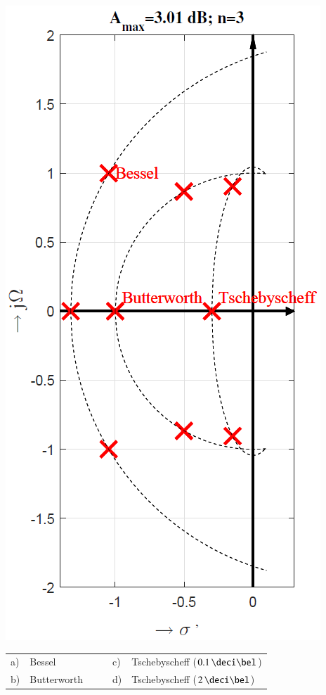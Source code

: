 \begin{minipage}[c]{0.28\columnwidth}
    \includegraphics[width=\columnwidth]{images/filter_vergleich_pollagen.png}
\end{minipage}

\begin{tabular}{ll cc ll}
    a) & Bessel         & & & c) & Tschebyscheff ($0.1 \, \deci \bel$) \\
    b) & Butterworth    & & & d) & Tschebyscheff ($2 \, \deci \bel$) \\
\end{tabular}

